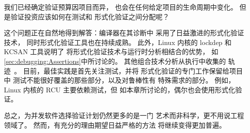 我们已经确定验证预算因项目而异，
也会在任何给定项目的生命周期中变化。
但是验证投资应该如何在测试和
形式化验证之间分配呢？

这个问题正在自然地得到解答：编译器在其诊断中
采用了日益激进的形式化验证技术，
同时形式化验证工具也在持续成熟。
此外，Linux 内核的 lockdep 和 KCSAN 工具说明了
将形式化验证技术与运行时分析相结合的优势，
如\cref{sec:debugging:Assertions}中所讨论的。
其他组合技术分析从执行中收集的
轨迹~\cite{DanielBristot2019RTtrace}。
目前，最佳实践是首先关注测试，并将
形式化验证的专门工作保留给项目中
测试不能很好覆盖的那些部分，以及对鲁棒性有
特殊需求的部分。
例如，Linux 内核的 RCU 主要依赖测试，但
如本章所讨论的，偶尔也会使用形式化验证。

总之，为并发软件选择验证计划仍然更多的是一门
艺术而非科学，更不用说工程领域了。
然而，有充分的理由期望日益严格的方法
将继续变得更加普遍。

